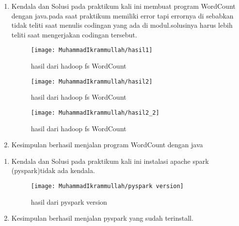 \begin{enumerate}
\item Kendala dan Solusi
\newline pada praktikum kali ini membuat program WordCount dengan java.pada saat praktikum memiliki error tapi errornya di sebabkan tidak teliti saat menulis codingan yang ada di modul.solusinya harus lebih teliti saat mengerjakan codingan tersebut.

\begin{figure}[!ht]
\texttt{[image: MuhammadIkrammullah/hasil1]}
\caption{hasil dari hadoop fs WordCount}
\label{gam:perkuliahan2-12}
\end{figure}

\begin{figure}[!ht]
\texttt{[image: MuhammadIkrammullah/hasil2]}
\caption{hasil dari hadoop fs WordCount}
\label{gam:perkuliahan2-12}
\end{figure}

\begin{figure}[!ht]
\texttt{[image: MuhammadIkrammullah/hasil2\_2]}
\caption{hasil dari hadoop fs WordCount}
\label{gam:perkuliahan2-12}
\end{figure}

\item Kesimpulan
\newline berhasil menjalan program WordCount dengan java

\end{enumerate}

\begin{enumerate}
\item Kendala dan Solusi
\newline pada praktikum kali ini instalasi apache spark (pyspark)tidak ada kendala.

\begin{figure}[!ht]
\texttt{[image: MuhammadIkrammullah/pyspark version]}
\caption{hasil dari pyspark version}
\label{gam:perkuliahan2-15}
\end{figure}

\item Kesimpulan
\newline berhasil menjalan pyspark yang sudah terinstall.
\end{enumerate}

